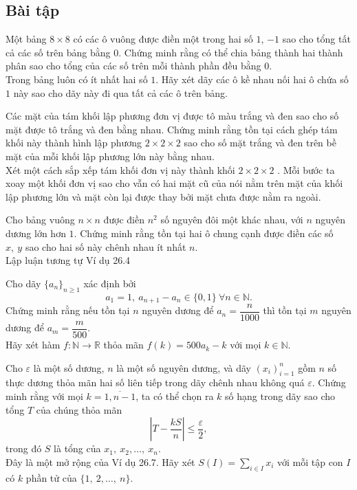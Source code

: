 \subsection{Bài tập}
\begin{bt}
	Một bảng $8 \times 8$ có các ô vuông được điền một trong hai số $1$, $-1$ sao cho tổng tất cả các số trên bảng bằng $0$. Chứng minh rằng có thể chia bảng thành hai thành phân sao cho tổng của các số trên mỗi thành phần đều bằng $0$.\\ 
	 Trong bảng luôn có ít nhất hai số $1$. Hãy xét dãy các ô kề nhau nối hai ô chứa số $1$ này sao cho dãy này đi qua tất cả các ô trên bảng.
\end{bt}
\begin{bt}
	Các mặt của tám khối lập phương đơn vị được tô màu trắng và đen sao cho số mặt được tô trắng và đen bằng nhau. Chứng minh rằng tồn tại cách ghép tám khối này thành hình lập phương $2\times 2\times 2$ sao cho số mặt trắng và đen trên bề mặt của mỗi khối lập phương lớn này bằng nhau.\\
	 Xét một cách sắp xếp tám khối đơn vị này thành khối $2\times 2\times 2$
	. Mỗi bước ta xoay một khối đơn vị sao cho vẫn có hai mặt cũ của nói nằm trên mặt của khối lập phương lớn và mặt còn lại được thay bởi mặt chưa được nằm ra ngoài.
	
\end{bt}
\begin{bt}
	Cho bảng vuông $n\times n$ được điền $n^2$ số nguyên đôi một khác nhau, với $n$ nguyên dương lớn hơn $1$. Chứng minh rằng tồn tại hai ô chung cạnh được điền các số $x,\ y$ sao cho hai số này chênh nhau ít nhất $n$.\\
	Lập luận tương tự Ví dụ 26.4
\end{bt}
\begin{bt}
	Cho dãy $\{a_n\}_{n\geq 1}$ xác định bởi $$a_1=1,\ a_{n+1}-a_n \in \{0,1\}\ \forall n\in \mathbb{N}.$$
	Chứng minh rằng nếu tồn tại $n$ nguyên dương để $a_n=\dfrac{n}{1000}$ thì tồn tại $m$ nguyên dương để $a_m=\dfrac{m}{500}.$\\
	Hãy xét hàm $f:\mathbb{N} \to \mathbb{R}$ thỏa mãn $f(k)=500a_k-k$ với mọi $k \in \mathbb{N}.$
\end{bt}
\begin{bt}
	Cho $\varepsilon $  là một số dương, $n$ là một số nguyên dương, và dãy $(x_i)_{i=1}^n$ gồm $n$ số thực dương thỏa mãn hai số liên tiếp trong dãy chênh nhau không quá $\varepsilon$. Chứng minh rằng với mọi $k=\overline{1,n-1}$, ta có thể chọn ra $k$ số hạng trong dãy sao cho tổng $T$ của chúng thỏa mãn $$\left|T-\dfrac{kS}{n} \right| \leq \dfrac{\varepsilon}{2},$$ trong đó $S$ là tổng của $x_1,\ x_2,\ldots,\ x_n.$\\ 
	Đây là một mở rộng của Ví dụ 26.7. Hãy xét $S(I)=\sum\limits_{i\in I} x_i$ với mỗi tập con $I$ có $k$ phần tử của $\{1,\ 2,\ldots,\ n\}.$ 
\end{bt}

